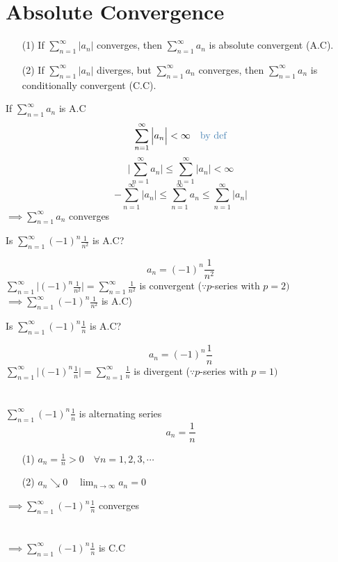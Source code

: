 \section{Absolute Convergence}
\begin{defn}[A.C and C.C]
\begin{itemize}
\item[(1)] If \(\displaystyle \sum^{\infty}_{n = 1} \Big| a_n \Big|\) converges, then \(\displaystyle \sum^{\infty}_{n = 1} a_n\) is absolute convergent (A.C).
\item[(2)] If \(\displaystyle \sum^{\infty}_{n = 1} \Big| a_n \Big|\) diverges, but \(\displaystyle \sum^{\infty}_{n = 1} a_n\) converges, then \(\displaystyle \sum^{\infty}_{n = 1} a_n\) is conditionally convergent (C.C).
\end{itemize}
\end{defn}
\begin{notn}
If \(\displaystyle \sum^{\infty}_{n = 1} a_n\) is A.C
\[\displaystyle \sum^{\infty}_{n = 1} \Big| a_n \Big| < \infty \text{\quad \tssteelblue{by def}}\] 
\[\displaystyle \Big| \sum^{\infty}_{n = 1} a_n \Big| \leq \sum^{\infty}_{n = 1} \Big| a_n \Big| < \infty\]
\[\displaystyle - \sum^{\infty}_{n = 1} \Big| a_n \Big| \leq \sum^{\infty}_{n = 1} a_n \leq \sum^{\infty}_{n = 1} \Big| a_n \Big|\]
\(\implies \displaystyle \sum^{\infty}_{n = 1} a_n\) converges
\end{notn}
\begin{eg}
Is \(\displaystyle \sum^{\infty}_{n = 1} (-1)^n \frac{1}{n^2}\) is A.C?

\soln
\[\displaystyle a_n = (-1)^n \frac{1}{n^2}\]
\(\displaystyle \sum^{\infty}_{n = 1} \Big| (-1)^n \frac{1}{n^2} \Big| = \sum^{\infty}_{n = 1} \frac{1}{n^2}\) is convergent \quad (\(\because p\)-series with \(\displaystyle p = 2)\)\\
\(\implies \displaystyle \sum^{\infty}_{n = 1} (-1)^n \frac{1}{n^2}\) is A.C)
\end{eg}
\begin{eg}
Is \(\displaystyle \sum^{\infty}_{n = 1} (-1)^n \frac{1}{n}\) is A.C?

\soln
\[\displaystyle a_n = (-1)^n \frac{1}{n}\]
\(\displaystyle \sum^{\infty}_{n = 1} \Big| (-1)^n \frac{1}{n} \Big| = \sum^{\infty}_{n = 1} \frac{1}{n}\) is divergent \quad (\(\because p\)-series with \(p = 1)\)\\\\\\
\(\displaystyle \sum^{\infty}_{n = 1} (-1)^n \frac{1}{n}\) is alternating series
\[\displaystyle a_n = \frac{1}{n}\]
\begin{itemize}
\item[(1)] \(\displaystyle a_n = \frac{1}{n} > 0 \quad \forall n = 1, 2, 3, \cdots\)
\item[(2)] \(a_n \searrow 0 \quad \displaystyle \lim_{n \to \infty} a_n = 0\)
\end{itemize}
\(\implies \displaystyle \sum^{\infty}_{n = 1} (-1)^n \frac{1}{n}\) converges\\\\\\
\(\implies \displaystyle \sum^{\infty}_{n = 1} (-1)^n \frac{1}{n}\) is C.C
\end{eg}
